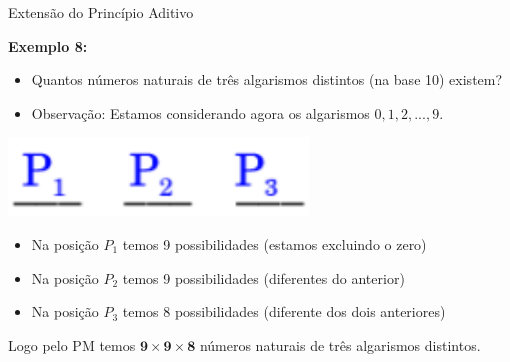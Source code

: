 \documentclass[aspectratio=169]{beamer}
\begin{document}
\begin{frame}{Extensão do Princípio Aditivo}

    \textbf{Exemplo 8:}

\begin{itemize}
    \item Quantos números naturais de três algarismos distintos (na
    base 10) existem?
    
    \vspace{3mm}
    \item[] Observação: Estamos considerando agora os algarismos $0, 1, 2, ..., 9.$
\end{itemize}

\begin{center}
    \includegraphics[width=0.3\linewidth]{figs/3digitos3.png}
\end{center}

\begin{itemize}
    \item Na posição $P_1$ temos 9 possibilidades (estamos excluindo o zero)
    \item Na posição $P_2$ temos 9 possibilidades (diferentes do anterior)
    \item Na posição $P_3$ temos 8 possibilidades (diferente dos dois anteriores) 
\end{itemize}
\vspace{2mm}

Logo pelo PM temos $\boldsymbol{9 \times 9 \times 8}$ números naturais de três algarismos
distintos.
\end{frame}
\end{document}
